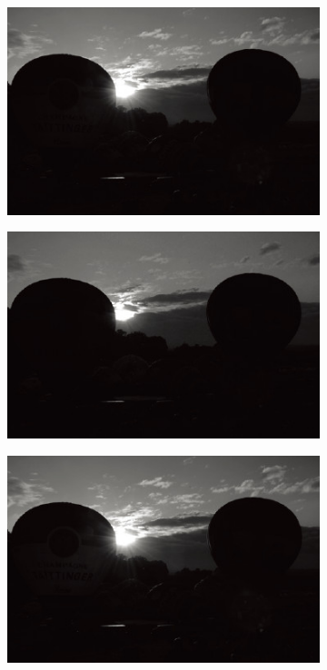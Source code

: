 \documentclass[letterpaper,10pt]{article}
\begin{document}
\begin{figure}[htbp]
\begin{subfigure}{0.11\textwidth}
					\includegraphics[width=\linewidth]{picture/LLIE/Division Gets Better/G1}
					\captionsetup{font=scriptsize}
					\label{fig: G1}	
				\end{subfigure}
				\begin{subfigure}{0.11\textwidth}
					\includegraphics[width=\linewidth]{picture/LLIE/Division Gets Better/B1}
					\captionsetup{font=scriptsize}
					\label{fig: B1}	
				\end{subfigure}
				\begin{subfigure}{0.11\textwidth}
					\includegraphics[width=\linewidth]{picture/LLIE/Division Gets Better/Y1}

\end{subfigure}
\end{figure}
\end{document}
